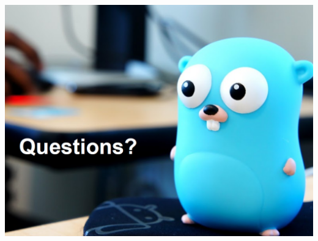 \documentclass[14pt]{beamer}
\begin{document}
{\begin{frame}
\begin{columns}
\begin{column}{0.4\textwidth}
        \end{column}
    \end{columns}
\end{frame}
}

{
\begin{frame}
        \includegraphics[width=\textwidth]{img/questions.PNG}
\end{frame}
}
\end{document}
